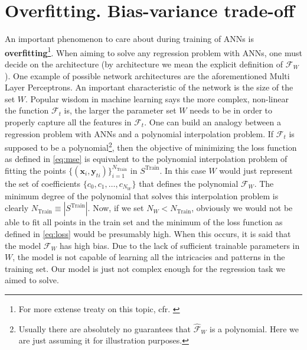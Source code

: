\section{Overfitting. Bias-variance trade-off}\label{sec:overfitting}
\indent An important phenomenon to care about during training of ANNs is \textbf{overfitting}\footnote{For more extense treaty on this topic, cfr. \cite{Marsland2015Machine}}. When aiming to solve any regression problem with ANNs, one must decide on the architecture (by architecture we mean the explicit definition of $\mathcal{{F}}_W$). One example of possible network architectures are the aforementioned Multi Layer Perceptrons. An important characteristic of the network is the size of the set $W$. Popular wisdom in machine learning says the more complex, non-linear the function $\mathcal{F}_t$ is, the larger the parameter set $W$ needs to be in order to properly capture all the features in $\mathcal{F}_t$. One can build an analogy between a regression problem with ANNs and a polynomial interpolation problem. If $\mathcal{F}_t$ is supposed to be a polynomial\footnote{Usually there are absolutely no guarantees that $\mathcal{\hat{F}}_W$ is a polynomial. Here we are just assuming it for illustration purposes.}, then the objective of minimizing the loss function as defined in \cref{eq:mse} is equivalent to the polynomial interpolation problem of fitting the points $\{(\mathbf{x}_i,\mathbf{y}_{ti})\}_{i=1}^{N_{\text{Train}}}$ in $S^\text{Train}$. In this case $W$ would just represent the set of coefficients $\{c_0,c_1,\ldots,c_{N_W}\}$ that defines the polynomial $\mathcal{{F}}_W$. The minimum degree of the polynomial that solves this interpolation problem is clearly $N_{\text{Train}}\equiv\left|S^{\text{Train}}\right|$. Now, if we set $N_W<N_{\text{Train}}$, obviously we would not be able to fit all points in the train set and the minimum of the loss function as defined in \cref{eq:loss} would be presumably high. When this occurs, it is said that the model $\mathcal{{F}}_W$ has high bias. Due to the lack of sufficient trainable parameters in $W$, the model is not capable of learning all the intricacies and patterns in the training set. Our model is just not complex enough for the regression task we aimed to solve.\\
%
